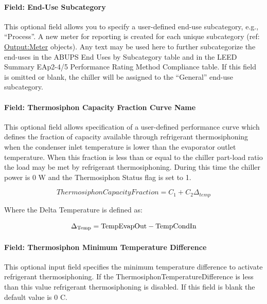 \paragraph{Field: End-Use Subcategory}\label{end-use-subcategory-13}

This optional field allows you to specify a user-defined end-use subcategory, e.g., ``Process''. A new meter for reporting is created for each unique subcategory (ref: \hyperref[outputmeter-and-outputmetermeterfileonly]{Output:Meter} objects). Any text may be used here to further subcategorize the end-uses in the ABUPS End Uses by Subcategory table and in the LEED Summary EAp2-4/5 Performance Rating Method Compliance table. If this field is omitted or blank, the chiller will be assigned to the ``General'' end-use subcategory.

\paragraph{Field: Thermosiphon Capacity Fraction Curve Name}\label{thermosiphon-capacity-fraction-curve-name1}

This optional field allows specification of a user-defined performance curve which defines the fraction of capacity available through refrigerant thermosiphoning when the condenser inlet temperature is lower than the evaporator outlet temperature. When this fraction is less than or equal to the chiller part-load ratio the load may be met by refrigerant thermosiphoning. During this time the chiller power is 0 W and the Thermosiphon Status flag is set to 1.

\begin{equation}
    ThermosiphonCapacityFraction = {C_1} + {C_2}{\Delta_{temp}}
\end{equation}

Where the Delta Temperature is defined as:

\begin{equation}
{\Delta_{{\rm{Temp}}}}
    = {\rm{TempEvapOut  -  TempCondIn }}
\end{equation}

\paragraph{Field: Thermosiphon Minimum Temperature Difference}\label{thermosiphon-minimum-temperature-difference1}

This optional input field specifies the minimum temperature difference to activate refrigerant thermosiphoning. If the ThermosiphonTemperatureDifference is less than this value refrigerant thermosiphoning is disabled. If this field is blank the default value is 0 C.


